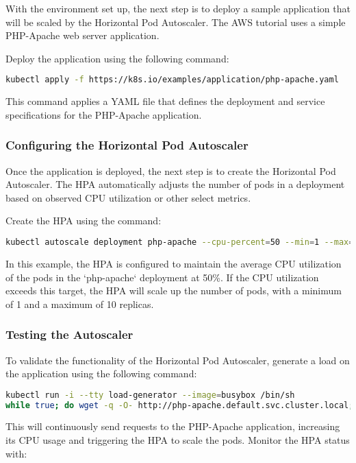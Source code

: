 With the environment set up, the next step is to deploy a sample application that will be scaled by the Horizontal Pod Autoscaler. The AWS tutorial uses a simple PHP-Apache web server application.

Deploy the application using the following command:

\begin{lstlisting}[language=bash]
kubectl apply -f https://k8s.io/examples/application/php-apache.yaml
\end{lstlisting}

This command applies a YAML file that defines the deployment and service specifications for the PHP-Apache application.

\subsubsection{Configuring the Horizontal Pod Autoscaler}

Once the application is deployed, the next step is to create the Horizontal Pod Autoscaler. The HPA automatically adjusts the number of pods in a deployment based on observed CPU utilization or other select metrics.

Create the HPA using the command:

\begin{lstlisting}[language=bash]
kubectl autoscale deployment php-apache --cpu-percent=50 --min=1 --max=10
\end{lstlisting}

In this example, the HPA is configured to maintain the average CPU utilization of the pods in the `php-apache` deployment at 50\%. If the CPU utilization exceeds this target, the HPA will scale up the number of pods, with a minimum of 1 and a maximum of 10 replicas.

\subsubsection{Testing the Autoscaler}

To validate the functionality of the Horizontal Pod Autoscaler, generate a load on the application using the following command:

\begin{lstlisting}[language=bash]
kubectl run -i --tty load-generator --image=busybox /bin/sh
while true; do wget -q -O- http://php-apache.default.svc.cluster.local; done
\end{lstlisting}

This will continuously send requests to the PHP-Apache application, increasing its CPU usage and triggering the HPA to scale the pods. Monitor the HPA status with:

